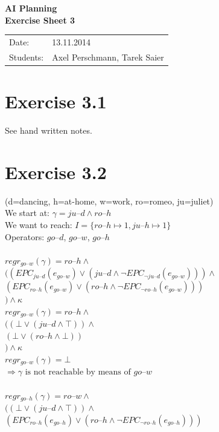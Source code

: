 \documentclass[11pt,a4paper]{article}
\newcommand{\h}[0]{\text{--}}
\begin{document}
\begin{center}
\Huge{\textbf{AI Planning}}\\
\LARGE{\textbf{Exercise Sheet 3}}
\end{center}
\vspace{2cm}
\begin{tabular}{ll}
Date: & 13.11.2014\\
Students: & Axel Perschmann, Tarek Saier
\end{tabular}

\section*{Exercise 3.1}
See hand written notes.

\section*{Exercise 3.2}
(d=dancing, h=at-home, w=work, ro=romeo, ju=juliet)\\
We start at: $\gamma=ju\h d\land ro\h h$\\
We want to reach: $I=\{ro\h h\mapsto1,ju\h h\mapsto1\}$\\
Operators: $go\h d$, $go\h w$, $go\h h$\\
\\
$regr_{go\h w}(\gamma)=ro\h h\land$\\
\hphantom{aaaa}$((EPC_{ju\h d}(e_{go\h w})\lor (ju\h d\land \neg EPC_{\neg ju\h d}(e_{go\h w})))\land$\\
\hphantom{aaaaaa}$(EPC_{ro\h h}(e_{go\h w})\lor (ro\h h\land \neg EPC_{\neg ro\h h}(e_{go\h w})))$\\
\hphantom{aaaa}$) \land \kappa$\\
$regr_{go\h w}(\gamma)=ro\h h\land$\\
\hphantom{aaaa}$((\bot \lor (ju\h d\land \top))\land$\\
\hphantom{aaaaaa}$(\bot \lor (ro\h h\land \bot))$\\
\hphantom{aaaa}$) \land \kappa$\\
$regr_{go\h w}(\gamma)=\bot$\\
$\Rightarrow \gamma \text{ is not reachable by means of } go\h w$\\
\\
$regr_{go\h h}(\gamma)=ro\h w\land$\\
\hphantom{aaaa}$((\bot \lor (ju\h d\land \top))\land$\\
\hphantom{aaaaaa}$(EPC_{ro\h h}(e_{go\h h})\lor (ro\h h\land \neg EPC_{\neg ro\h h}(e_{go\h h})))$\\
\end{document}
